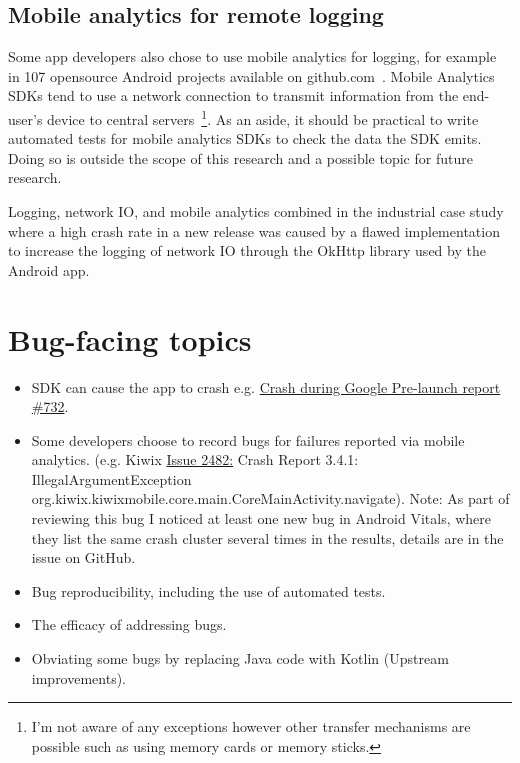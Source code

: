 \subsection{Mobile analytics for remote logging}
Some app developers also chose to use mobile analytics for logging, for example in 107 opensource Android projects available on github.com~\citep{harty2021_logging_practices_with_mobile_analytics}. Mobile Analytics SDKs tend to use a network connection to transmit information from the end-user's device to central servers~\footnote{I'm not aware of any exceptions however other transfer mechanisms are possible such as using memory cards or memory sticks.}. As an aside, it should be practical to write automated tests for mobile analytics SDKs to check the data the SDK emits. Doing so is outside the scope of this research and a possible topic for future research. %

Logging, network IO, and mobile analytics combined in the industrial case study where a high crash rate in a new release was caused by a flawed implementation to increase the logging of network IO through the OkHttp library used by the Android app. 

\section{Bug-facing topics}

\begin{itemize}
    \itemsep0em 
    \item SDK can cause the app to crash e.g. \href{https://github.com/segmentio/analytics-android/issues/732}{Crash during Google Pre-launch report \#732}.
    \item Some developers choose to record bugs for failures reported via mobile analytics. (e.g. Kiwix \href{https://github.com/kiwix/kiwix-android/issues/2482}{Issue 2482:} Crash Report 3.4.1: IllegalArgumentException org.kiwix.kiwixmobile.core.main.CoreMainActivity.navigate). Note: As part of reviewing this bug I noticed at least one new bug in Android Vitals, where they list the same crash cluster several times in the results, details are in the issue on GitHub.
    \item Bug reproducibility, including the use of automated tests.
    \item The efficacy of addressing bugs.
    \item Obviating some bugs by replacing Java code with Kotlin (Upstream improvements).
\end{itemize}

